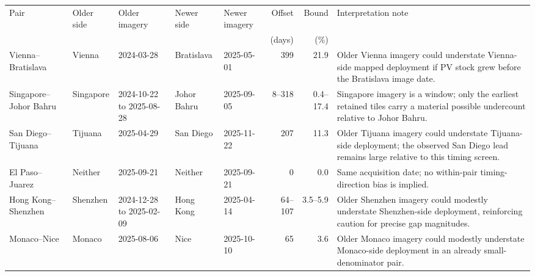 \begin{tabular}{@{}lp{}p{}p{}p{}rrp{}@{}}
\toprule
Pair & Older side & Older imagery & Newer side & Newer imagery & Offset & Bound & Interpretation note \\
 & & & & & (days) & (\%) & \\
\midrule
Vienna--Bratislava & Vienna & 2024-03-28 & Bratislava & 2025-05-01 & 399 & 21.9 & Older Vienna imagery could understate Vienna-side mapped deployment if PV stock grew before the Bratislava image date. \\
Singapore--Johor Bahru & Singapore & 2024-10-22 to 2025-08-28 & Johor Bahru & 2025-09-05 & 8--318 & 0.4--17.4 & Singapore imagery is a window; only the earliest retained tiles carry a material possible undercount relative to Johor Bahru. \\
San Diego--Tijuana & Tijuana & 2025-04-29 & San Diego & 2025-11-22 & 207 & 11.3 & Older Tijuana imagery could understate Tijuana-side deployment; the observed San Diego lead remains large relative to this timing screen. \\
El Paso--Juarez & Neither & 2025-09-21 & Neither & 2025-09-21 & 0 & 0.0 & Same acquisition date; no within-pair timing-direction bias is implied. \\
Hong Kong--Shenzhen & Shenzhen & 2024-12-28 to 2025-02-09 & Hong Kong & 2025-04-14 & 64--107 & 3.5--5.9 & Older Shenzhen imagery could modestly understate Shenzhen-side deployment, reinforcing caution for precise gap magnitudes. \\
Monaco--Nice & Monaco & 2025-08-06 & Nice & 2025-10-10 & 65 & 3.6 & Older Monaco imagery could modestly understate Monaco-side deployment in an already small-denominator pair. \\
\bottomrule
\end{tabular}
